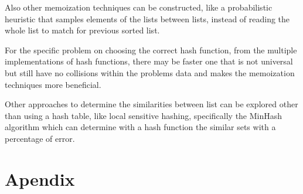 \documentclass[a4paper,12pt]{article}
\begin{document}
Also other memoization techniques can be constructed, like a probabilistic heuristic that samples elements of the lists between lists, instead of reading the whole list to match for previous sorted list.

For the specific problem on choosing the correct hash function, from the multiple implementations of hash functions, there may be faster one that is not universal but still have no collisions within the problems data and makes the memoization techniques more beneficial.

Other approaches to determine the similarities between list can be explored other than using a hash table, like local sensitive hashing, specifically the MinHash algorithm which can determine with a hash function the similar sets with a percentage of error.





\section{Apendix}
\end{document}
